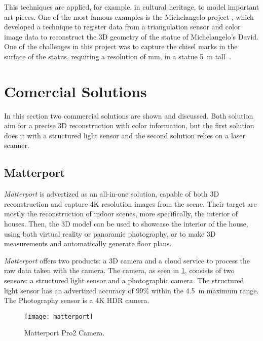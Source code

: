 This techniques are applied, for example, in cultural heritage, to model important art pieces. One of the most famous examples is the Michelangelo project \cite{levoy2000}, which developed a technique to register data from a triangulation sensor and color image data to reconstruct the 3D geometry of the statue of Michelangelo's David. One of the challenges in this project was to capture the chisel marks in the surface of the status, requiring a resolution of  \si{\milli\meter}, in a statue \SI{5}{\meter} tall~\cite{levoy2000}.

\section{Comercial Solutions}

In this section two commercial solutions are shown and discussed. Both solution aim for a precise 3D reconstruction with color information, but the first solution does it with a structured light sensor and the second solution relies on a laser scanner. 

\subsection{Matterport}

\emph{Matterport} is advertized as an all-in-one solution, capable of both 3D reconstruction and capture 4K resolution images from the scene. Their target are mostly the reconstruction of indoor scenes, more specifically, the interior of houses. Then, the 3D model can be used to showcase the interior of the house, using both virtual reality or panoramic photography, or to make 3D measurements and automatically generate floor plans\cite{matterport}.

\emph{Matterport} offers two products: a 3D camera and a cloud service to process the raw data taken with the camera. The camera, as seen in \cref{fig:matterport-camera}, consists of two sensors: a structured light sensor and a photographic camera\cite{matterport}. The structured light sensor has an advertized accuracy of $99\%$ within the \SI{4.5}{\meter} maximum range. The Photography sensor is a 4K HDR camera.

\begin{figure}[h]
    
    \centering
    \texttt{[image: matterport]}

    \caption{Matterport Pro2 Camera.}
    \label{fig:matterport-camera}

\end{figure}

